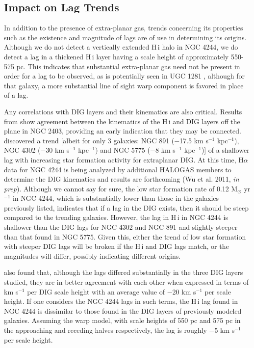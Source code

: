 \documentclass{emulateapj}
\begin{document}
\subsection{Impact on Lag Trends} \label{Section6.2}


\par
    In addition to the presence of extra-planar gas, trends concerning its properties such as the existence and magnitude of lags are of use in determining its origins.  Although we do not detect a vertically extended {\sc H\,i} halo in NGC 4244, we do detect a lag in a thickened {\sc H\,i} layer having a scale height of approximately 550-575 pc.  This indicates that substantial extra-planar gas need not be present in order for a lag to be observed, as is potentially seen in UGC 1281 \citep{2011arXiv1103.0699K}, although for that galaxy, a more substantial line of sight warp component is favored in place of a lag.

\par
     Any correlations with DIG layers and their kinematics are also critical.  Results from \citet{2004A&A...424..485F} show agreement between the kinematics of the {\sc H\,i} and DIG layers off the plane in NGC 2403, providing an early indication that they may be connected.  \citet{2007ApJ...663..933H} discovered a trend [albeit for only 3 galaxies: NGC 891 ($-$17.5 km s$^{-1}$ kpc$^{-1}$), NGC 4302 ($-$30 km s$^{-1}$ kpc$^{-1}$) and NGC 5775 ($-$8 km s$^{-1}$ kpc$^{-1}$)] of a shallower lag with increasing star formation activity for extraplanar DIG.  At this time, H$\alpha$ data for NGC 4244 is being analyzed by additional HALOGAS members to determine the DIG kinematics and results are forthcoming (Wu et al. 2011, \textit{in prep}). Although we cannot say for sure, the low star formation rate of 0.12 M$_{\odot}$ yr$^{-1}$ in NGC 4244, which is substantially lower than those in the galaxies previously listed, indicates that if a lag in the DIG exists, then it should be steep compared to the trending galaxies.   However, the lag in {\sc H\,i} in NGC 4244 is shallower than the DIG lags for NGC 4302 and NGC 891 and slightly steeper than that found in NGC 5775.  Given this, either the trend of low star formation with steeper DIG lags will be broken if the {\sc H\,i} and DIG lags match, or the magnitudes will differ, possibly indicating different origins.  

\par
     \citet{2007ApJ...663..933H} also found that, although the lags differed substantially in the three DIG layers studied, they are in better agreement with each other when expressed in terms of km s$^{-1}$ per DIG scale height with an average value of $-$20 km s$^{-1}$ per scale height. If one considers the NGC 4244 lags in such terms, the {\sc H\,i} lag found in NGC 4244 is dissimilar to those found in the DIG layers of previously modeled galaxies.  Assuming the warp model, with scale heights of 550 pc and 575 pc in the approaching and receding halves respectively, the lag is roughly $-$5 km s$^{-1}$ per scale height. 
\end{document}
